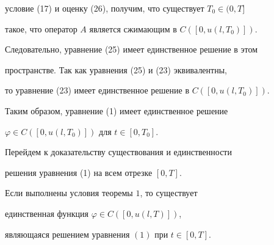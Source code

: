 \begin{pf}
условие (17) и оценку (26), получим, что существует $T_0\in (0,T]$


такое, что оператор $A$ является сжимающим в $C([0,u(l,T_0)])$.


Следовательно, уравнение (25) имеет единственное решение в этом


пространстве. Так как уравнения (25) и (23) эквивалентны,


то уравнение (23) имеет единственное решение в $C([0,u(l,T_0)])$.


Таким образом, уравнение (1) имеет единственное решение


$\varphi \in C([0,u(l,T_0)])$ для $t\in [0,T_0]$.


\end{pf}





Перейдем к доказательству существования и единственности


решения уравнения (1) на всем отрезке $[0,T]$.





\begin{thm} Если выполнены условия теоремы $1$, то существует


единственная функция $\varphi \in C([0,u(l,T)])$,


являющаяся решением уравнения $(1)$ при $t\in [0,T]$.


\end{thm}





